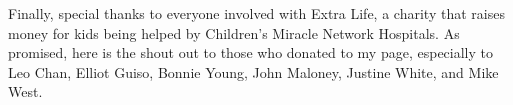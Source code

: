 \documentclass[hidelinks,final]{pittetd}
\begin{document}
Finally, special thanks to everyone involved with Extra Life, a charity that raises money for kids being helped by Children's Miracle Network Hospitals. As promised, here is the shout out to those who donated to my page, especially to Leo Chan, Elliot Guiso, Bonnie Young, John Maloney, Justine White, and Mike West.

%

\makeatletter
\setlength{\@fptop}{0pt} %
\makeatother












%
\appendix


%
%
\end{document}
